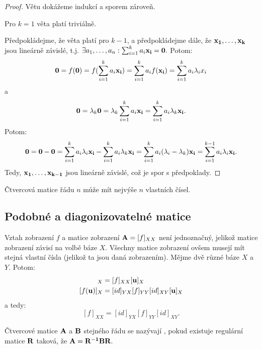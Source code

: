 \begin{proof}
    Větu dokážeme indukcí a sporem zároveň. 

    Pro $k=1$ věta platí triviálně. 
    
    Předpokládejme, že věta platí pro $k-1$, a předpokládejme dále, že 
    $\mathbf{x_1}, \dots, \mathbf{x_k}$ jsou lineárně závislé, 
    t.j. $\exists a_1, \dots,
    a_n: \sum_{i=1}^k a_i\mathbf{x_i} = \mathbf{0}.$ Potom:
    $$ \mathbf{0} = f(\mathbf{0}) = f(\sum_{i=1}^k a_i\mathbf{x_i}) = \sum_{i=1}^k a_i f(\mathbf{x_i}) =
    \sum_{i=1}^k a_i \lambda_i x_i$$
    a
    $$\mathbf{0} = \lambda_k \mathbf{0} = \lambda_k \sum_{i=1}^k a_i\mathbf{x_i} = \sum_{i=1}^k
    a_i\lambda_k\mathbf{x_i}.$$
    Potom:
    $$\mathbf{0} = \mathbf{0} - \mathbf{0} = \sum_{i=1}^k a_i \lambda_i \mathbf{x_i} - \sum_{i=1}^k
    a_i\lambda_k\mathbf{x_i} = \sum_{i=1}^{k} a_i(\lambda_i - \lambda_k)\mathbf{x_i} =
    \sum_{i=1}^{k-1} a_i\lambda_i\mathbf{x_i}.$$
    Tedy, $\mathbf{x_1}, \dots, \mathbf{x_{k-1}}$ jsou lineárně závislé, což je spor
    s předpoklady.
\end{proof}

\begin{corollary}
    Čtvercová matice řádu $n$ může mít nejvýše $n$ vlastních čísel.
\end{corollary}

\subsection{Podobné a diagonizovatelné matice}

\begin{remark}
    Vztah zobrazení $f$ a matice zobrazení $\mathbf{A} = [f]_{XX}$ není jednoznačný, 
    jelikož matice zobrazení závisí na volbě báze $X$. Všechny matice
    zobrazení ovšem musejí mít stejná vlastní čísla (jelikož ta jsou
    daná zobrazením). Mějme dvě různé báze $X$ a $Y$. Potom:
    \begin{align*}
        [f(\vu)]_X &= [f]_{XX}[\vu]_X \\
        [f(\vu)]_X &= [id]_{YX}[f]_{YY}[id]_{XY}[\vu]_X \\
    \end{align*}
    a tedy:
    $$[f]_{XX} = [id]_{YX}[f]_{YY}[id]_{XY}.$$
\end{remark}

\begin{definition}
    Čtvercové matice $\mathbf{A}$ a $\mathbf{B}$ stejného řádu se nazývají 
    , pokud existuje regulární matice $\mathbf{R}$ taková, že
    $\mathbf{A} = \mathbf{R^{-1}} \mathbf{B} \mathbf{R}.$
\end{definition}

